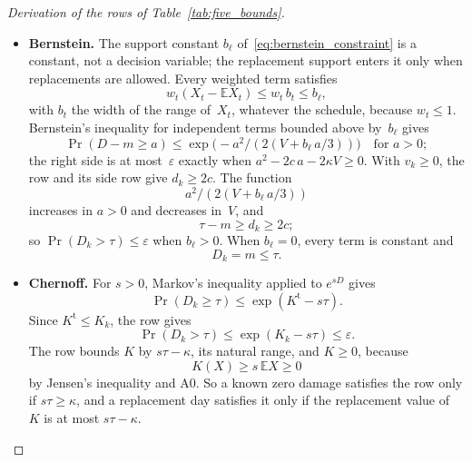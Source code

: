 \documentclass[11pt,a4paper]{article}
\theoremstyle{plain}
\theoremstyle{definition}
\theoremstyle{remark}
\begin{document}
\begin{proof}[Derivation of the rows of Table~\ref{tab:five_bounds}]
\begin{itemize}
\begin{equation}
    \end{equation}
    because $\exp(-2d^2/R)$ increases in~$R$ and decreases in~$d$.
  \item \textbf{Bernstein.} The support constant $b_\ell$ of~\eqref{eq:bernstein_constraint} is a constant, not a decision variable; the replacement support enters it only when replacements are allowed.
    Every weighted term satisfies
    \begin{equation}
      w_t(X_t - \mathbb{E}X_t) \le w_t\, b_t \le b_\ell,
    \end{equation}
    with $b_t$ the width of the range of~$X_t$, whatever the schedule, because $w_t \le 1$.
    Bernstein's inequality for independent terms bounded above by~$b_\ell$ gives
    \begin{equation}
      \Pr(D - m \ge a) \le \exp\bigl(-a^2/(2(V + b_\ell\,a/3))\bigr) \quad\text{for } a > 0;
    \end{equation}
    the right side is at most~$\varepsilon$ exactly when $a^2 - 2c\,a - 2\kappa V \ge 0$.
    With $v_k \ge 0$, the row and its side row give $d_k \ge 2c$.
    The function
    \begin{equation}
      a^2/(2(V + b_\ell\,a/3))
    \end{equation}
    increases in $a > 0$ and decreases in~$V$, and
    \begin{equation}
      \tau - m \ge d_k \ge 2c;
    \end{equation}
    so $\Pr(D_k > \tau) \le \varepsilon$ when $b_\ell > 0$.
    When $b_\ell = 0$, every term is constant and
    \begin{equation}
      D_k = m \le \tau.
    \end{equation}
  \item \textbf{Chernoff.} For $s > 0$, Markov's inequality applied to $e^{sD}$ gives
    \begin{equation}
      \Pr(D_k \ge \tau) \le \exp(K^{\mathrm{t}} - s\tau).
    \end{equation}
    Since $K^{\mathrm{t}} \le K_k$, the row gives
    \begin{equation}
      \Pr(D_k > \tau) \le \exp(K_k - s\tau) \le \varepsilon.
    \end{equation}
    The row bounds $K$ by $s\tau - \kappa$, its natural range, and $K \ge 0$, because
    \begin{equation}
      K(X) \ge s\,\mathbb{E}X \ge 0
    \end{equation}
    by Jensen's inequality and A0.
    So a known zero damage satisfies the row only if $s\tau \ge \kappa$, and a replacement day satisfies it only if the replacement value of~$K$ is at most $s\tau - \kappa$.
\end{itemize}
\end{proof}
\end{document}
